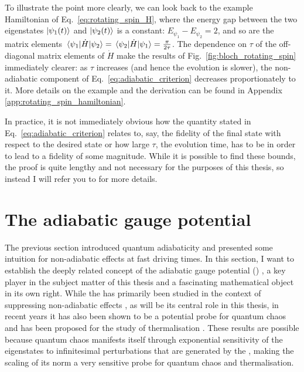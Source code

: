     To illustrate the point more clearly, we can look back to the example Hamiltonian of Eq.~\eqref{eq:rotating_spin_H}, where the energy gap between the two eigenstates $\ket{\psi_1(t)}$ and $\ket{\psi_2(t)}$ is a constant: $E_{\psi_1} - E_{\psi_2} = 2$, and so are the matrix elements $\mel{\psi_1}{\dot{H}}{\psi_2} = \mel{\psi_2}{\dot{H}}{\psi_1} = \frac{\pi}{2 \tau}$. The dependence on $\tau$ of the off-diagonal matrix elements of $\dot{H}$ make the results of Fig.~\ref{fig:bloch_rotating_spin} immediately clearer: as $\tau$ increases (and hence the evolution is slower), the non-adiabatic component of Eq.~\eqref{eq:adiabatic_criterion} decreases proportionately to it. More details on the example and the derivation can be found in Appendix \ref{app:rotating_spin_hamiltonian}.

     In practice, it is not immediately obvious how the quantity stated in Eq.~\eqref{eq:adiabatic_criterion} relates to, say, the fidelity of the final state with respect to the desired state or how large $\tau$, the evolution time, has to be in order to lead to a fidelity of some magnitude. While it is possible to find these bounds, the proof is quite lengthy and not necessary for the purposes of this thesis, so instead I will refer you to \cite{reichardt_quantum_2004, childs_lecture_2008} for more details.
    
    \section{The adiabatic gauge potential}\label{sec:2.2_AGP}

    The previous section introduced quantum adiabaticity and presented some intuition for non-adiabatic effects at fast driving times. In this section, I want to establish the deeply related concept of the adiabatic gauge potential () \cite{kolodrubetz_geometry_2017}, a key player in the subject matter of this thesis and a fascinating mathematical object in its own right. While the  has primarily been studied in the context of suppressing non-adiabatic effects \cite{sels_minimizing_2017, claeys_floquet-engineering_2019}, as will be its central role in this thesis, in recent years it has also been shown to be a potential probe for quantum chaos \cite{pandey_adiabatic_2020} and has been proposed for the study of thermalisation \cite{nandy_delayed_2022}. These results are possible because quantum chaos manifests itself through exponential sensitivity of the eigenstates to infinitesimal perturbations that are generated by the , making the scaling of its norm a very sensitive probe for quantum chaos and thermalisation.


